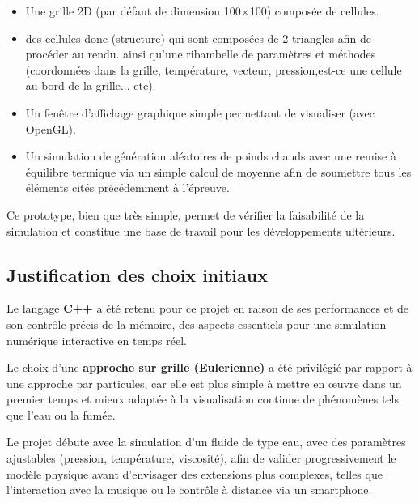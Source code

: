 \documentclass{article}
\begin{document}
   \begin{itemize}
      \item Une grille 2D (par défaut de dimension 100×100) composée de cellules.
      \item des cellules donc (structure) qui sont composées de 2 triangles afin de procéder au rendu. ainsi qu'une ribambelle de paramètres et méthodes (coordonnées dans la grille, température, vecteur, pression,est-ce une cellule au bord de la grille... etc).
      \item Un fenêtre d'affichage graphique simple permettant de visualiser (avec OpenGL).
      \item Un simulation de génération aléatoires de poinds chauds avec une remise à équilibre termique via un simple calcul de moyenne afin de soumettre tous les éléments cités précédemment à l'épreuve. 
   \end{itemize}

   Ce prototype, bien que très simple, permet de vérifier la faisabilité de la simulation et constitue une 
   base de travail pour les développements ultérieurs.

   \subsection{Justification des choix initiaux}

   Le langage \textbf{C++} a été retenu pour ce projet en raison de ses performances et de son contrôle précis 
   de la mémoire, des aspects essentiels pour une simulation numérique interactive en temps réel.

   Le choix d’une \textbf{approche sur grille (Eulerienne)} a été privilégié par rapport à une approche 
   par particules, car elle est plus simple à mettre en œuvre dans un premier temps et mieux adaptée à la 
   visualisation continue de phénomènes tels que l’eau ou la fumée.

   Le projet débute avec la simulation d’un fluide de type eau, avec des paramètres ajustables (pression, 
   température, viscosité), afin de valider progressivement le modèle physique avant d’envisager des extensions 
   plus complexes, telles que l’interaction avec la musique ou le contrôle à distance via un smartphone.
\end{document}
